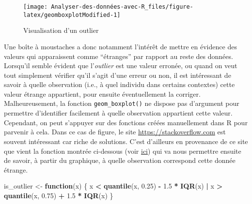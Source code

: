 \documentclass[
  french,
]{book}
\newenvironment{Shaded}{\begin{snugshade}}{\end{snugshade}}
\newcommand{\ControlFlowTok}[1]{\textcolor[rgb]{0.13,0.29,0.53}{\textbf{#1}}}
\newcommand{\FloatTok}[1]{\textcolor[rgb]{0.00,0.00,0.81}{#1}}
\newcommand{\KeywordTok}[1]{\textcolor[rgb]{0.13,0.29,0.53}{\textbf{#1}}}
\newcommand{\NormalTok}[1]{#1}
\newcommand{\OperatorTok}[1]{\textcolor[rgb]{0.81,0.36,0.00}{\textbf{#1}}}
\newcommand{\StringTok}[1]{\textcolor[rgb]{0.31,0.60,0.02}{#1}}
\begin{document}
\begin{figure}

{\centering \texttt{[image: Analyser-des-données-avec-R\_files/figure-latex/geomboxplotModified-1]} 

}

\caption{Visualisation d'un outlier}\label{fig:geomboxplotModified}
\end{figure}

Une boîte à moustaches a donc notamment l'intérêt de mettre en évidence des valeurs qui apparaissent comme \enquote{étranges} par rapport au reste des données. Lorsqu'il semble évident que l'\emph{outlier} est une valeur erronée, ou quand on veut tout simplement vérifier qu'il s'agit d'une erreur ou non, il est intéressant de savoir à quelle observation (i.e., à quel individu dans certains contextes) cette valeur étrange appartient, pour ensuite éventuellement la corriger. Malheureusement, la fonction \texttt{geom\_boxplot()} ne dispose pas d'argument pour permettre d'identifier facilement à quelle observation appartient cette valeur. Cependant, on peut s'appuyer sur des fonctions créées manuellement dans R pour parvenir à cela. Dans ce cas de figure, le site \url{https://stackoverflow.com} est souvent intéressant car riche de solutions. C'est d'ailleurs en provenance de ce site que vient la fonction montrée ci-dessous (voir \href{https://stackoverflow.com/questions/33524669/labeling-outliers-of-boxplots-in-r}{ici}) qui va nous permettre ensuite de savoir, à partir du graphique, à quelle observation correspond cette donnée étrange.

\begin{Shaded}
\begin{Highlighting}[]
\NormalTok{is_outlier <-}\StringTok{ }\ControlFlowTok{function}\NormalTok{(x) \{}
\NormalTok{  x }\OperatorTok{<}\StringTok{ }\KeywordTok{quantile}\NormalTok{(x, }\FloatTok{0.25}\NormalTok{) }\OperatorTok{-}\StringTok{ }\FloatTok{1.5} \OperatorTok{*}\StringTok{ }\KeywordTok{IQR}\NormalTok{(x) }\OperatorTok{|}\StringTok{ }\NormalTok{x }\OperatorTok{>}\StringTok{ }\KeywordTok{quantile}\NormalTok{(x, }\FloatTok{0.75}\NormalTok{) }\OperatorTok{+}\StringTok{ }\FloatTok{1.5} \OperatorTok{*}\StringTok{ }\KeywordTok{IQR}\NormalTok{(x)}
\NormalTok{\}}
\end{Highlighting}
\end{Shaded}
\end{document}
